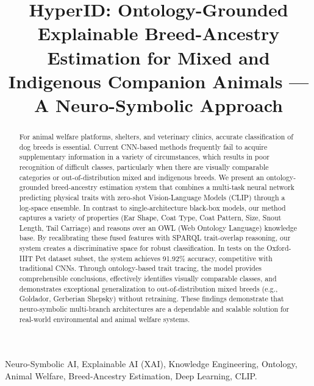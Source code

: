 \documentclass[conference]{IEEEtran}
\begin{document}
\title{HyperID: Ontology-Grounded Explainable Breed-Ancestry Estimation for Mixed and Indigenous Companion Animals --- A Neuro-Symbolic Approach}

\author{
}

\maketitle

\begin{abstract}
For animal welfare platforms, shelters, and veterinary clinics, accurate classification of dog breeds is essential. Current CNN-based methods frequently fail to acquire supplementary information in a variety of circumstances, which results in poor recognition of difficult classes, particularly when there are visually comparable categories or out-of-distribution mixed and indigenous breeds. We present an ontology-grounded breed-ancestry estimation system that combines a multi-task neural network predicting physical traits with zero-shot Vision-Language Models (CLIP) through a log-space ensemble. In contrast to single-architecture black-box models, our method captures a variety of properties (Ear Shape, Coat Type, Coat Pattern, Size, Snout Length, Tail Carriage) and reasons over an OWL (Web Ontology Language) knowledge base. By recalibrating these fused features with SPARQL trait-overlap reasoning, our system creates a discriminative space for robust classification. In tests on the Oxford-IIIT Pet dataset subset, the system achieves 91.92\% accuracy, competitive with traditional CNNs. Through ontology-based trait tracing, the model provides comprehensible conclusions, effectively identifies visually comparable classes, and demonstrates exceptional generalization to out-of-distribution mixed breeds (e.g., Goldador, Gerberian Shepsky) without retraining. These findings demonstrate that neuro-symbolic multi-branch architectures are a dependable and scalable solution for real-world environmental and animal welfare systems.
\end{abstract}

\begin{IEEEkeywords}
Neuro-Symbolic AI, Explainable AI (XAI), Knowledge Engineering, Ontology, Animal Welfare, Breed-Ancestry Estimation, Deep Learning, CLIP.
\end{IEEEkeywords}
\end{document}
